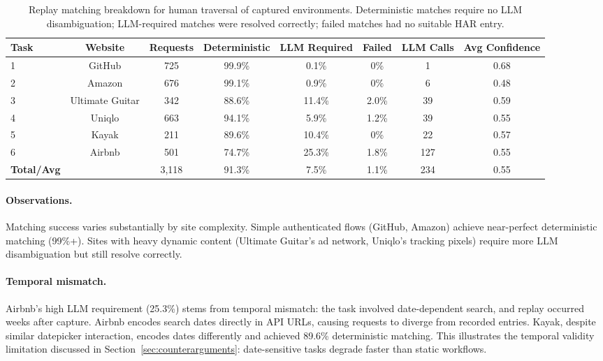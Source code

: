 \documentclass[letterpaper]{article}
\begin{document}
\begin{table}[t]
\caption{Replay matching breakdown for human traversal of captured environments. Deterministic matches require no LLM disambiguation; LLM-required matches were resolved correctly; failed matches had no suitable HAR entry.}
\label{tab:replay-validation}
\vskip 0.1in
\centering
\small
\begin{tabular}{@{}lccccccc@{}}
\toprule
\textbf{Task} & \textbf{Website} & \textbf{Requests} & \textbf{Deterministic} & \textbf{LLM Required} & \textbf{Failed} & \textbf{LLM Calls} & \textbf{Avg Confidence} \\
\midrule
1 & GitHub & 725 & 99.9\% & 0.1\% & 0\% & 1 & 0.68 \\
2 & Amazon & 676 & 99.1\% & 0.9\% & 0\% & 6 & 0.48 \\
3 & Ultimate Guitar & 342 & 88.6\% & 11.4\% & 2.0\% & 39 & 0.59 \\
4 & Uniqlo & 663 & 94.1\% & 5.9\% & 1.2\% & 39 & 0.55 \\
5 & Kayak & 211 & 89.6\% & 10.4\% & 0\% & 22 & 0.57 \\
6 & Airbnb & 501 & 74.7\% & 25.3\% & 1.8\% & 127 & 0.55 \\
\midrule
\textbf{Total/Avg} & & 3,118 & 91.3\% & 7.5\% & 1.1\% & 234 & 0.55 \\
\bottomrule
\end{tabular}
\end{table}

\paragraph{Observations.} Matching success varies substantially by site complexity. Simple authenticated flows (GitHub, Amazon) achieve near-perfect deterministic matching (99\%+). Sites with heavy dynamic content (Ultimate Guitar's ad network, Uniqlo's tracking pixels) require more LLM disambiguation but still resolve correctly.

\paragraph{Temporal mismatch.} Airbnb's high LLM requirement (25.3\%) stems from temporal mismatch: the task involved date-dependent search, and replay occurred weeks after capture. Airbnb encodes search dates directly in API URLs, causing requests to diverge from recorded entries. Kayak, despite similar datepicker interaction, encodes dates differently and achieved 89.6\% deterministic matching. This illustrates the temporal validity limitation discussed in Section~\ref{sec:counterarguments}: date-sensitive tasks degrade faster than static workflows.
\end{document}
